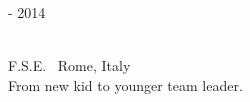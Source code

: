 \bigskip

\begin{minipage}{.3\textwidth}
	 - 2014 \faCalendar
\end{minipage}
\hfill
\begin{minipage}{.64\textwidth}
	\vfill
	 \\
	\color{Maroon} F.S.E. \color{Sepia} \hfill \faMapMarker \ Rome, Italy
	\smallskip
	\\
	\color{gray} From new kid to younger team leader.
	\vfill
\end{minipage}
